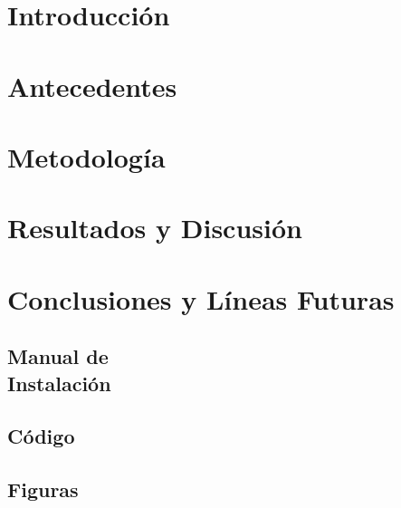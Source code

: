 \documentclass[12pt, a4paper, twoside]{article}
\begin{document}


\clearpage
\setcounter{page}{1}



\newpage



\newpage



\tableofcontents

\section{Introducción}


\section{Antecedentes}


\section{Metodología}



\section{Resultados y Discusión}


\section{Conclusiones y Líneas Futuras}


\printbibliography


\newpage

\begin{umaappendices}
  \section{Manual de \\ Instalación}
\end{umaappendices}

\begin{umaappendices}
  \section{Código}
  
\end{umaappendices}

\begin{umaappendices}
  \section{Figuras}
\end{umaappendices}



\end{document}

